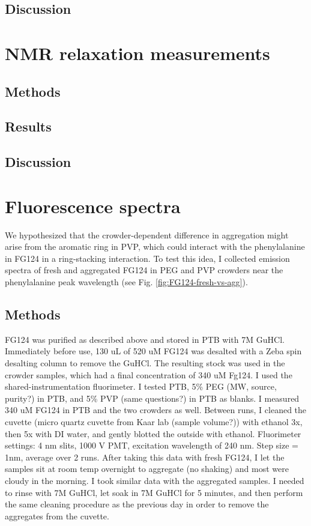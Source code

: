 \subsection{Discussion}

\section{NMR relaxation measurements}
\subsection{Methods}
\subsection{Results}
\subsection{Discussion}

\section{Fluorescence spectra}
We hypothesized that the crowder-dependent difference in aggregation might arise from the aromatic ring in PVP, which could interact with the phenylalanine in FG124 in a ring-stacking interaction.  To test this idea, I collected emission spectra of fresh and aggregated FG124 in PEG and PVP crowders near the phenylalanine peak wavelength (see Fig. \ref{fig:FG124-fresh-vs-agg}). 
\subsection{Methods}
FG124 was purified as described above and stored in PTB with 7M GuHCl.  Immediately before use, 130 uL of 520 uM FG124 was desalted with a Zeba spin desalting column to remove the GuHCl.  The resulting stock was used in the crowder samples, which had a final concentration of 340 uM Fg124.  I used the shared-instrumentation fluorimeter.  I tested PTB, 5\% PEG (MW, source, purity?) in PTB, and 5\% PVP (same questions?) in PTB as blanks.  I measured 340 uM FG124 in PTB and the two crowders as well.  Between runs, I cleaned the cuvette (micro quartz cuvette from Kaar lab (sample volume?)) with ethanol 3x, then 5x with DI water, and gently blotted the outside with ethanol.  Fluorimeter settings: 4 nm slits, 1000 V PMT, excitation wavelength of 240 nm.  Step size  = 1nm, average over 2 runs.  After taking this data with fresh FG124, I let the samples sit at room temp overnight to aggregate (no shaking) and most were cloudy in the morning.  I took similar data with the aggregated samples.  I needed to rinse with 7M GuHCl, let soak in 7M GuHCl for 5 minutes, and then perform the same cleaning procedure as the previous day in order to remove the aggregates from the cuvette.
